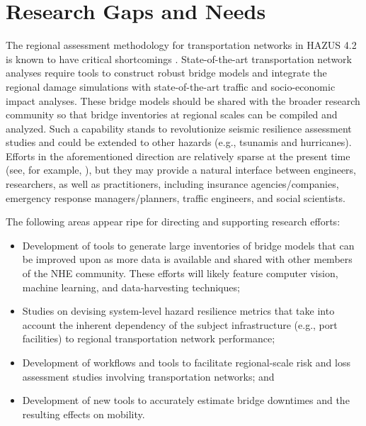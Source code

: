 \section{Research Gaps and Needs}
\label{sec:perf_transport_gaps}

The regional assessment methodology for transportation networks in HAZUS 4.2 is known to have critical shortcomings \citep[e.g.][]{mangalathu2017bridge}. State-of-the-art transportation network analyses require tools to construct robust bridge models and integrate the regional damage simulations with state-of-the-art traffic and socio-economic impact analyses. These bridge models should be shared with the broader research community so that bridge inventories at regional scales can be compiled and analyzed. Such a capability stands to revolutionize seismic resilience assessment studies and could be extended to other hazards (e.g., tsunamis and hurricanes). Efforts in the aforementioned direction are relatively sparse at the present time (see, for example, \citep{koc2020comprehensive}), but they may provide a natural interface between engineers, researchers, as well as practitioners, including insurance agencies/companies, emergency response managers/planners, traffic engineers, and social scientists. 

The following areas appear ripe for directing and supporting research efforts:
\begin{itemize}
    \item Development of tools to generate large inventories of bridge models that can be improved upon as more data is available and shared with other members of the NHE community. These efforts will likely feature computer vision, machine learning, and data-harvesting techniques;
    \item Studies on devising system-level hazard resilience metrics that take into account the inherent dependency of the subject infrastructure (e.g., port facilities) to regional transportation network performance;
    \item Development of workflows and tools to facilitate regional-scale risk and loss assessment studies involving transportation networks; and
    \item Development of new tools to accurately estimate bridge downtimes and the resulting effects on mobility.
\end{itemize}

